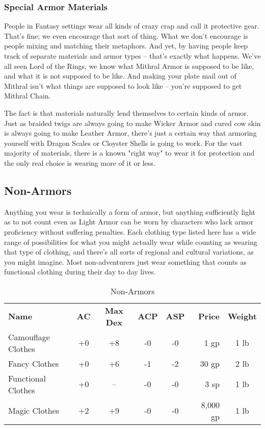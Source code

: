 \subsubsection{Special Armor Materials}

People in Fantasy settings wear all kinds of crazy crap and call it protective gear. That's fine; we even encourage that sort of thing. What we don't encourage is people mixing and matching their metaphors. And yet, by having people keep track of separate materials and armor types -- that's exactly what happens. We've all seen Lord of the Rings, we know what Mithral Armor is supposed to be like, and what it is not supposed to be like. And making your plate mail out of Mithral isn't what things are supposed to look like -- you're supposed to get Mithral Chain.

The fact is that materials naturally lend themselves to certain kinds of armor. Just as braided twigs are always going to make Wicker Armor and cured cow skin is always going to make Leather Armor, there's just a certain way that armoring yourself with Dragon Scales or Cloyster Shells is going to work. For the vast majority of materials, there is a known "right way" to wear it for protection and the only real choice is wearing more of it or less.

\subsection{Non-Armors}

Anything you wear is technically a form of armor, but anything sufficiently light as to not count even as Light Armor can be worn by characters who lack armor proficiency without suffering penalties. Each clothing type listed here has a wide range of possibilities for what you might actually wear while counting as wearing that type of clothing, and there's all sorts of regional and cultural variations, as you might imagine. Most non-adventurers just wear something that counts as functional clothing during their day to day lives.

\begin{table}[htb]
\caption{Non-Armors}
\centering
\begin{tabular}{l *{4}{c} r c}
\textbf{Name} & \textbf{AC} & \textbf{Max Dex} & \textbf{ACP} & \textbf{ASP} & \textbf{Price} & \textbf{Weight}\\
Camouflage Clothes & +0 & +8 & -0 & -0 & 1 gp & 1 lb\\
Fancy Clothes & +0 & +6 & -1 & -2 & 30 gp & 2 lb\\
Functional Clothes & +0 & -- & -0 & -0 & 3 sp & 1 lb\\
Magic Clothes & +2 & +9 & -0 & -0 & 8,000 gp & 1 lb\\
\end{tabular}
\end{table}

